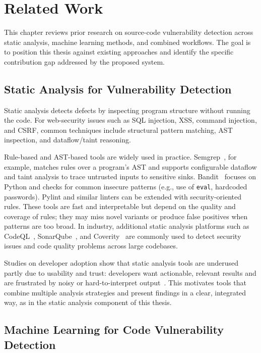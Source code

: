 \chapter{Related Work}
\label{ch:related_work}

This chapter reviews prior research on source-code vulnerability detection across static analysis, machine learning methods, and combined workflows. The goal is to position this thesis against existing approaches and identify the specific contribution gap addressed by the proposed system.

\section{Static Analysis for Vulnerability Detection}
\label{sec:rw_static}

Static analysis detects defects by inspecting program structure without running the code. For web-security issues such as SQL injection, XSS, command injection, and CSRF, common techniques include structural pattern matching, AST inspection, and dataflow/taint reasoning.

Rule-based and AST-based tools are widely used in practice. Semgrep~\cite{Semgrep}, for example, matches rules over a program's AST and supports configurable dataflow and taint analysis to trace untrusted inputs to sensitive sinks. Bandit~\cite{Bandit} focuses on Python and checks for common insecure patterns (e.g., use of \texttt{eval}, hardcoded passwords). Pylint and similar linters can be extended with security-oriented rules. These tools are fast and interpretable but depend on the quality and coverage of rules; they may miss novel variants or produce false positives when patterns are too broad. In industry, additional static analysis platforms such as CodeQL~\cite{GitHubCodeQL}, SonarQube~\cite{SonarQube}, and Coverity~\cite{Coverity} are commonly used to detect security issues and code quality problems across large codebases.

Studies on developer adoption show that static analysis tools are underused partly due to usability and trust: developers want actionable, relevant results and are frustrated by noisy or hard-to-interpret output~\cite{Christakis2016,Johnson2013}. This motivates tools that combine multiple analysis strategies and present findings in a clear, integrated way, as in the static analysis component of this thesis.

\section{Machine Learning for Code Vulnerability Detection}
\label{sec:rw_ml}

